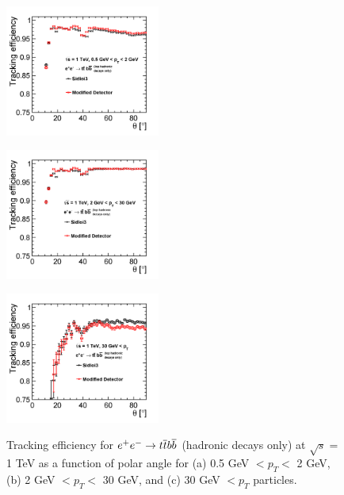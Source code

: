 \begin{figure}[h!]
\begin{minipage}{.33\textwidth}
\centering
\includegraphics[width=2.0in]{ttbb6qallEfficiencyThetaLowPt_sidloi3_det_vtxbar_3doublet.png}
\label{fig:ttbbeffthetalowpt}
\end{minipage}%
\begin{minipage}{.33\textwidth}
\centering
\includegraphics[width=2.0in]{ttbb6qallEfficiencyThetaMedPt_sidloi3_det_vtxbar_3doublet.png}
\label{fig:ttbbeffthetamedpt}
\end{minipage}
\begin{minipage}{.33\textwidth}
\centering
\includegraphics[width=2.0in]{ttbb6qallEfficiencyTheta30GeV_sidloi3_det_vtxbar_3doublet.png}
\label{fig:ttbbeffthetahighpt}
\end{minipage}
\caption{Tracking efficiency for $\ee \rightarrow \ttbar \bbbar$ (hadronic decays only) at $ \sqrt{s} = $ 1 TeV as a function of polar angle
for (a) 0.5 GeV $< p_{T} < $ 2 GeV, (b) 2 GeV $< p_{T} < $ 30 GeV, and (c) 30 GeV $< p_{T} $ particles.}
\label{fig:ttbbefftheta}
\end{figure}


